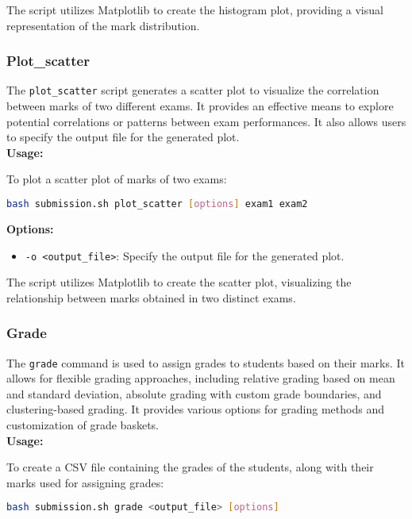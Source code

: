 \documentclass{article}
\begin{document}
The script utilizes Matplotlib to create the histogram plot, providing a visual representation of the mark distribution. 

\subsubsection{Plot\_scatter}
The \texttt{plot\_scatter} script generates a scatter plot to visualize the correlation between marks of two different exams. It provides an effective means to explore potential correlations or patterns between exam performances. It also allows users to specify the output file for the generated plot.\\
\textbf{Usage:}
\begin{adjustwidth}{0.5cm}{0cm}
To plot a scatter plot of marks of two exams:
\begin{lstlisting}[language=bash]
bash submission.sh plot_scatter [options] exam1 exam2
\end{lstlisting}
\end{adjustwidth}

\textbf{Options:}
\begin{itemize}
    \item \texttt{-o <output\_file>}: Specify the output file for the generated plot.
\end{itemize}

The script utilizes Matplotlib to create the scatter plot, visualizing the relationship between marks obtained in two distinct exams. 

\subsubsection{Grade}
The \texttt{grade} command is used to assign grades to students based on their marks. It allows for flexible grading approaches, including relative grading based on mean and standard deviation, absolute grading with custom grade boundaries, and clustering-based grading. It provides various options for grading methods and customization of grade baskets.\\
\textbf{Usage:}
\begin{adjustwidth}{0.5cm}{0cm}
To create a CSV file containing the grades of the students, along with their marks used for assigning grades:
\begin{lstlisting}[language=bash]
bash submission.sh grade <output_file> [options]
\end{lstlisting}
\end{adjustwidth}
\end{document}

